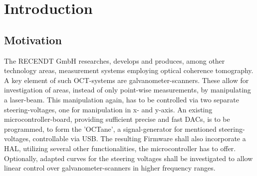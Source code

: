 \chapter{Introduction}
\label{cha:Introduction}


\section{Motivation}
The RECENDT GmbH researches, develops and produces, among other technology areas, measurement systems employing optical coherence tomography. A key element of such OCT-systems are galvanometer-scanners.  These allow for investigation of areas, instead of only point-wise measurements, by manipulating a laser-beam. This manipulation again, has to be controlled via two separate steering-voltages, one for manipulation in x- and y-axis. An existing microcontroller-board, providing sufficient precise and fast DACs, is to be programmed, to form the 'OCTane', a signal-generator for mentioned steering-voltages, controllable via USB. The resulting Firmware shall also incorporate a HAL, utilizing several other functionalities, the microcontroller has to offer. Optionally, adapted curves for the steering voltages shall be investigated to allow linear control over galvanometer-scanners in higher frequency ranges.

